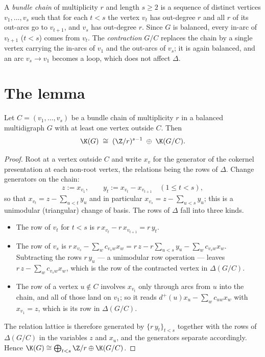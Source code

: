 \begin{definition}\label{ch03:def:chain}
A \emph{bundle chain} of multiplicity $r$ and length $s\ge2$ is a sequence of distinct
vertices $v_1,\dots,v_s$ such that for each $t<s$ the vertex $v_t$ has out-degree $r$ and
all $r$ of its out-arcs go to $v_{t+1}$, and $v_s$ has out-degree $r$. Since $G$ is
balanced, every in-arc of $v_{t+1}$ ($t<s$) comes from $v_t$. The \emph{contraction}
$G/C$ replaces the chain by a single vertex carrying the in-arcs of $v_1$ and the
out-arcs of $v_s$; it is again balanced, and an arc $v_s\to v_1$ becomes a loop, which
does not affect $\Delta$.
\end{definition}

\section{The lemma}\label{ch03:sec:lemma}

\begin{lemma}\label{ch03:lem:bundle}
Let $C=(v_1,\dots,v_s)$ be a bundle chain of multiplicity $r$ in a balanced multidigraph
$G$ with at least one vertex outside $C$. Then
\[
\K(G)\;\cong\;(\Z/r)^{s-1}\;\oplus\;\K(G/C).
\]
\end{lemma}

\begin{proof}
Root at a vertex outside $C$ and write $x_v$ for the generator of the cokernel
presentation at each non-root vertex, the relations being the rows of $\Delta$. Change
generators on the chain:
\[
z:=x_{v_1},\qquad y_t:=x_{v_t}-x_{v_{t+1}}\quad(1\le t<s),
\]
so that $x_{v_t}=z-\sum_{u<t}y_u$ and in particular $x_{v_s}=z-\sum_{u<s}y_u$; this is a
unimodular (triangular) change of basis. The rows of $\Delta$ fall into three kinds.
\begin{itemize}
\item The row of $v_t$ for $t<s$ is $r\,x_{v_t}-r\,x_{v_{t+1}}=r\,y_t$.
\item The row of $v_s$ is $r\,x_{v_s}-\sum_w c_{v_sw}x_w
=r\,z-r\sum_{u<s}y_u-\sum_w c_{v_sw}x_w$. Subtracting the rows $r\,y_u$ --- a unimodular
row operation --- leaves $r\,z-\sum_w c_{v_sw}x_w$, which is the row of the contracted
vertex in $\Delta(G/C)$.
\item The row of a vertex $u\notin C$ involves $x_{v_t}$ only through arcs from $u$ into
the chain, and all of those land on $v_1$; so it reads $d^+(u)x_u-\sum_w c_{uw}x_w$ with
$x_{v_1}=z$, which is its row in $\Delta(G/C)$.
\end{itemize}
The relation lattice is therefore generated by $\{r\,y_t\}_{t<s}$ together with the rows
of $\Delta(G/C)$ in the variables $z$ and $x_u$, and the generators separate accordingly.
Hence $\K(G)\cong\bigoplus_{t<s}\Z/r\oplus\K(G/C)$.
\end{proof}

